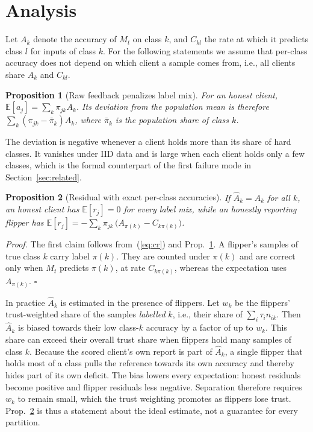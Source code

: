 \documentclass[conference]{IEEEtran}
\newtheorem{proposition}{Proposition}
\begin{document}
\section{Analysis}
\label{sec:analysis}
Let $A_k$ denote the accuracy of $M_t$ on class $k$, and $C_{kl}$ the rate at which it predicts class $l$ for inputs of class $k$. For the following statements we assume that per-class accuracy does not depend on which client a sample comes from, i.e., all clients share $A_k$ and $C_{kl}$.

\begin{proposition}[Raw feedback penalizes label mix]\label{prop:mix}
For an honest client, $\mathbb{E}[a_j]=\sum_k\pi_{jk}A_k$. Its deviation from the population mean is therefore $\sum_k(\pi_{jk}-\bar\pi_k)A_k$, where $\bar\pi_k$ is the population share of class $k$.
\end{proposition}

The deviation is negative whenever a client holds more than its share of hard classes. It vanishes under IID data and is large when each client holds only a few classes, which is the formal counterpart of the first failure mode in Section~\ref{sec:related}.

\begin{proposition}[Residual with exact per-class accuracies]\label{prop:cr}
If $\hat A_k=A_k$ for all $k$, an honest client has $\mathbb{E}[r_j]=0$ for every label mix, while an honestly reporting flipper has $\mathbb{E}[r_j]=-\sum_k\pi_{jk}\,\big(A_{\pi(k)}-C_{k\pi(k)}\big)$.
\end{proposition}
\emph{Proof.} The first claim follows from~(\ref{eq:cr}) and Prop.~\ref{prop:mix}. A flipper's samples of true class $k$ carry label $\pi(k)$. They are counted under $\pi(k)$ and are correct only when $M_t$ predicts $\pi(k)$, at rate $C_{k\pi(k)}$, whereas the expectation uses $A_{\pi(k)}$. \hfill$\square$

In practice $\hat A_k$ is estimated in the presence of flippers. Let $w_k$ be the flippers' trust-weighted share of the samples \emph{labelled} $k$, i.e., their share of $\sum_i\tau_in_{ik}$. Then $\hat A_k$ is biased towards their low class-$k$ accuracy by a factor of up to $w_k$. This share can exceed their overall trust share when flippers hold many samples of class $k$. Because the scored client's own report is part of $\hat A_k$, a single flipper that holds most of a class pulls the reference towards its own accuracy and thereby hides part of its own deficit. The bias lowers every expectation: honest residuals become positive and flipper residuals less negative. Separation therefore requires $w_k$ to remain small, which the trust weighting promotes as flippers lose trust. Prop.~\ref{prop:cr} is thus a statement about the ideal estimate, not a guarantee for every partition.
\end{document}
